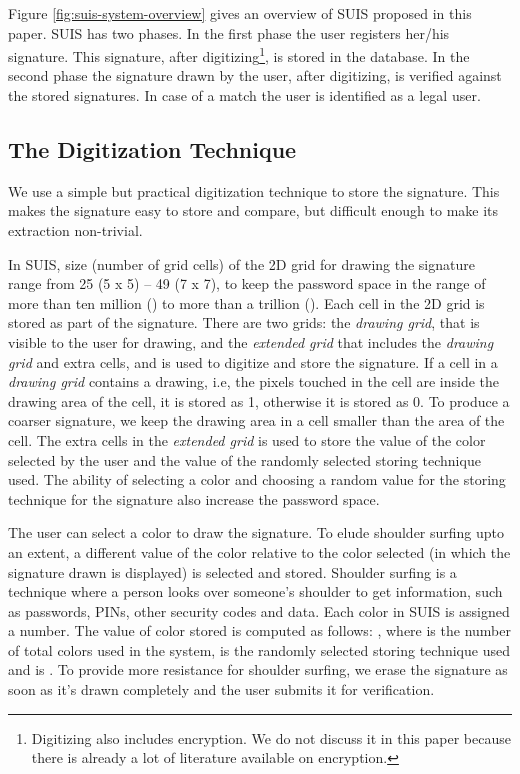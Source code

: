 \documentclass[conference]{IEEEtran}
\begin{document}
Figure \ref{fig:suis-system-overview} gives an overview of SUIS proposed in this paper. SUIS has two phases. In the first phase the user registers her/his signature. This signature, after digitizing\footnote{Digitizing also includes encryption. We do not discuss it in this paper because there is already a lot of literature available on encryption.}, is stored in the database. In the second phase the signature drawn by the user, after digitizing, is verified against the stored signatures. In case of a match the user is identified as a legal user.


\subsection{The Digitization Technique}\label{sec:digitization}

We use a simple but practical digitization technique to store the signature. This makes the signature easy to store and compare, but difficult enough to make its extraction non-trivial.

In SUIS, size (number of grid cells) of the 2D grid for drawing the signature range from 25 (5 x 5) -- 49 (7 x 7), to keep the password space in the range of more than ten million () to more than a trillion (). Each cell in the 2D grid is stored as part of the signature. There are two grids: the \emph{drawing grid}, that is visible to the user for drawing, and the \emph{extended grid} that includes the \emph{drawing grid} and extra cells, and is used to digitize and store the signature. If a cell in a \emph{drawing grid} contains a drawing, i.e, the pixels touched in the cell are inside the drawing area of the cell, it is stored as 1, otherwise it is stored as 0. To produce a coarser signature, we keep the drawing area in a cell smaller than the area of the cell. The extra cells in the \emph{extended grid} is used to store the value of the color selected by the user and the value of the randomly selected storing technique used. The ability of selecting a color and choosing a random value for the storing technique for the signature also increase the password space.

The user can select a color to draw the signature. To elude shoulder surfing upto an extent, a different value of the color relative to the color selected (in which the signature drawn is displayed) is selected and stored. Shoulder surfing is a technique where a person looks over someone's shoulder to get information, such as passwords, PINs, other security codes and data.  Each color in SUIS is assigned a number. The value of color stored is computed as follows: , where  is the number of total colors used in the system,  is the randomly selected storing technique used and  is  . To provide more resistance for shoulder surfing, we erase the signature as soon as it's drawn completely and the user submits it for verification.
\end{document}
